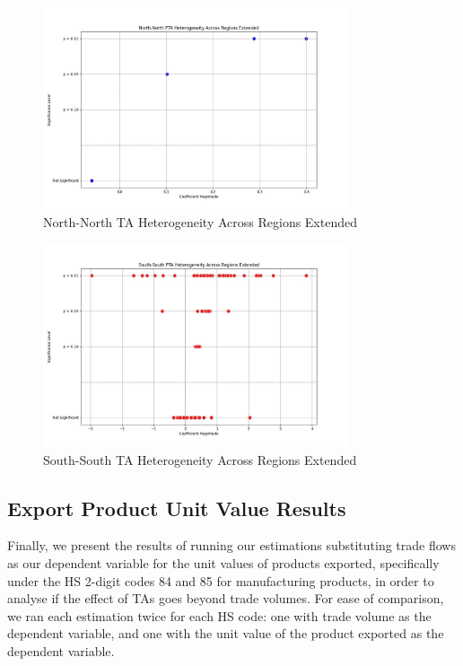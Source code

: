 %


\begin{figure}[h!]%
\centering%
\includegraphics[width=0.8\textwidth]{figures/North-North_trade_relationships_visualization.jpeg}%
\caption{North{-}North TA Heterogeneity Across Regions Extended}%
\end{figure}

%


\begin{figure}[h!]%
\centering%
\includegraphics[width=0.8\textwidth]{figures/South-South_trade_relationships_visualization.jpeg}%
\caption{South{-}South TA Heterogeneity Across Regions Extended}%
\end{figure}

%
\FloatBarrier

%
\subsection{Export Product Unit Value Results}%
\label{subsec:ExportProductUnitValueResults}%
Finally, we present the results of running our estimations substituting
trade flows as our dependent variable for the unit values of products
exported, specifically under the HS 2-digit codes 84 and 85 for
manufacturing products, in order to analyse if the effect of TAs goes
beyond trade volumes. For ease of comparison, we ran each estimation
twice for each HS code: one with trade volume as the dependent variable,
and one with the unit value of the product exported as the dependent
variable.


